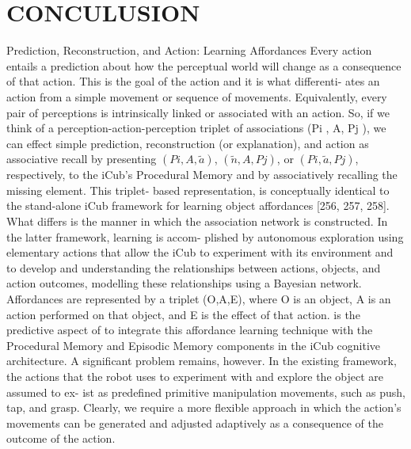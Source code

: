 \documentclass[a4paper, 11pt]{report}
\begin{document}
{\huge}\chapter{CONCULUSION}
Prediction, Reconstruction, and Action: Learning Affordances
Every action entails a prediction about how the perceptual world will change as 
a consequence of that action. This is the goal of the action and it is what 
differenti- ates an action from a simple movement or sequence of movements. 
Equivalently, every pair of perceptions is intrinsically linked or associated 
with an action. So, if we think of a perception-action-perception triplet of 
associations (Pi , A, Pj ), we can effect simple prediction, reconstruction (or 
explanation), and action as associative recall by presenting 
$(Pi,A,\tilde{a})$, 
$({\tilde{n}},A,Pj)$, or $(Pi,\tilde{a},Pj)$, respectively, to the 
iCub’s 
Procedural Memory and 
by 
associatively recalling the missing element. This triplet- based 
representation, is conceptually identical to the stand-alone iCub framework for 
learning object affordances [256, 257, 258]. What differs is the manner in 
which the association network is constructed. In the latter framework, learning 
is accom- plished by autonomous exploration using elementary actions that allow 
the iCub to experiment with its environment and to develop and understanding 
the relationships between actions, objects, and action outcomes, modelling 
these relationships using a Bayesian network. Affordances are represented by a 
triplet (O,A,E), where O is an object, A is an action performed on that object, 
and E is the effect of that action.  is the predictive aspect of 
to integrate this affordance learning technique with the Procedural Memory and 
Episodic Memory components in the iCub cognitive architecture.
A significant problem remains, however. In the existing framework, the actions 
that the robot uses to experiment with and explore the object are assumed to 
ex- ist as predefined primitive manipulation movements, such as push, tap, and 
grasp. Clearly, we require a more flexible approach in which the action’s 
movements can be generated and adjusted adaptively as a consequence of the 
outcome of the action.
\end{document}
